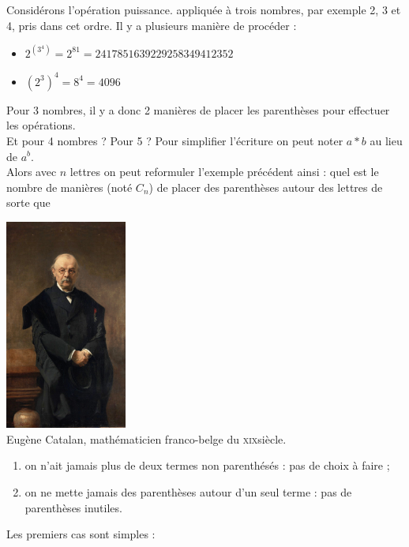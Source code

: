 \documentclass[a4paper,12pt,french]{article}
\begin{document}
\begin{exercice}
\vspace{1em}
\begin{minipage}{10cm}
Considérons l'opération \og puissance\fg{}. appliquée à trois nombres, par exemple 2, 3 et 4, pris dans cet ordre. Il y a plusieurs manière de
procéder :
\begin{itemize}
	\item	$2^{(3^4)}=2^{81}=2 417 851 639 229 258 349 412 352$
	\item 	$(2^3)^4 = 8^4=4096$
\end{itemize}
Pour 3 nombres, il y a donc 2 manières de placer les parenthèses pour effectuer les opérations.\\
Et pour 4 nombres ? Pour 5 ?
Pour simplifier l’écriture on peut noter $a*b$ au lieu de $a^b$. \\
Alors avec $n$ lettres on peut reformuler l’exemple précédent ainsi
: quel est le nombre de manières (noté $C_n$) de placer des parenthèses autour des lettres de sorte que
\end{minipage}\hspace{1.5cm}\begin{minipage}{4.2cm}
\begin{center}
\includegraphics[width=4cm]{img/catalan}\\\scriptsize
Eugène Catalan, mathématicien franco-belge du \textsc{xix}\eme siècle.
\end{center}\end{minipage}\vspace{.5em}

\begin{enumerate}[--]
	\item 	on n'ait jamais plus de deux termes non parenthésés : pas de choix à faire ;
	\item 	on ne mette jamais des parenthèses autour d’un seul terme : pas de parenthèses inutiles.
\end{enumerate}
Les premiers cas sont simples :


\end{exercice}
\end{document}

